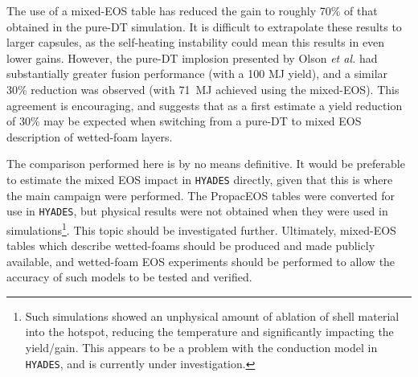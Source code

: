 The use of a mixed-EOS table has reduced the gain to roughly 70\% of that obtained in the pure-DT simulation. It is difficult to extrapolate these results to larger capsules, as the self-heating instability could mean this results in even lower gains. However, the pure-DT implosion presented by Olson \textit{et al.} \cite{Olson2020a} had substantially greater fusion performance (with a 100 MJ yield), and a similar 30\% reduction was observed (with 71~MJ achieved using the mixed-EOS). This agreement is encouraging, and suggests that as a first estimate a yield reduction of 30\% may be expected when switching from a pure-DT to mixed EOS description of wetted-foam layers.

The comparison performed here is by no means definitive. It would be preferable to estimate the mixed EOS impact in \texttt{HYADES} directly, given that this is where the main campaign were performed. The PropacEOS tables were converted for use in \texttt{HYADES}, but physical results were not obtained when they were used in simulations\footnote{Such simulations showed an unphysical amount of ablation of shell material into the hotspot, reducing the temperature and significantly impacting the yield/gain. This appears to be a problem with the conduction model in \texttt{HYADES}, and is currently under investigation.}. This topic should be investigated further. Ultimately, mixed-EOS tables which describe wetted-foams should be produced and made publicly available, and wetted-foam EOS experiments should be performed to allow the accuracy of such models to be tested and verified.


